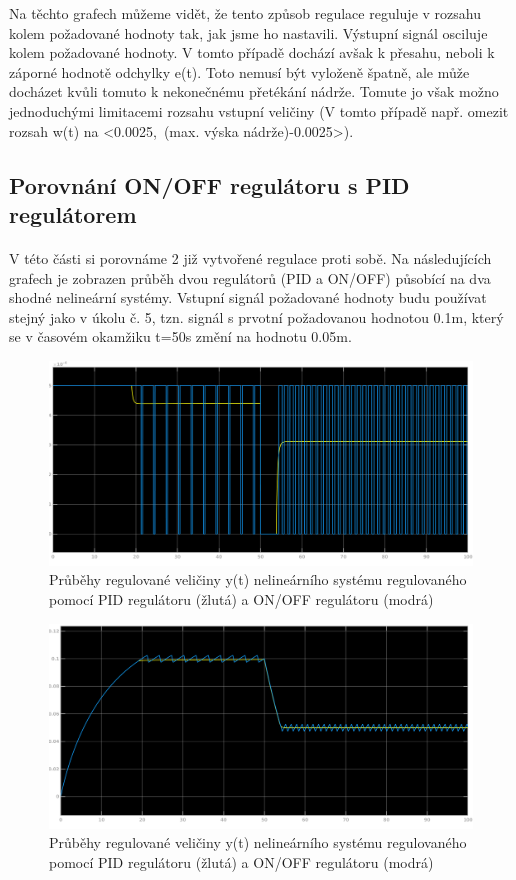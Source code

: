 \documentclass{article}
\begin{document}
\indent Na těchto grafech můžeme vidět, že tento způsob regulace reguluje v rozsahu kolem požadované hodnoty tak, jak jsme ho nastavili. Výstupní signál osciluje kolem požadované hodnoty. V tomto případě dochází avšak k přesahu, neboli k záporné hodnotě odchylky e(t). Toto nemusí být vyloženě špatně, ale může docházet kvůli tomuto k nekonečnému přetékání nádrže. Tomute jo však možno jednoduchými limitacemi rozsahu vstupní veličiny (V tomto případě např. omezit rozsah w(t) na <0.0025,~(max. výska nádrže)-0.0025>).

\subsection{Porovnání ON/OFF regulátoru s PID regulátorem}
\paragraph{}
	\indent V této části si porovnáme 2 již vytvořené regulace proti sobě. Na následujících grafech je zobrazen průběh dvou regulátorů (PID a ON/OFF) působící na dva shodné nelineární systémy. Vstupní signál požadované hodnoty budu používat stejný jako v úkolu č. 5, tzn. signál s prvotní požadovanou hodnotou 0.1m, který se v časovém okamžiku t=50s změní na hodnotu 0.05m.
	

\begin{figure}[H]
\includegraphics[width=\textwidth]{ukol6uComp}
\centering
\caption{Průběhy regulované veličiny y(t) nelineárního systému regulovaného pomocí PID regulátoru (žlutá) a ON/OFF regulátoru (modrá)}
\label{img:ut_onoffVSpid}
\end{figure}

\begin{figure}[H]
\includegraphics[width=\textwidth]{ukol6yComp}
\centering
\caption{Průběhy regulované veličiny y(t) nelineárního systému regulovaného pomocí PID regulátoru (žlutá) a ON/OFF regulátoru (modrá)}
\label{img:yt_onoffVSpid}
\end{figure}
\end{document}
